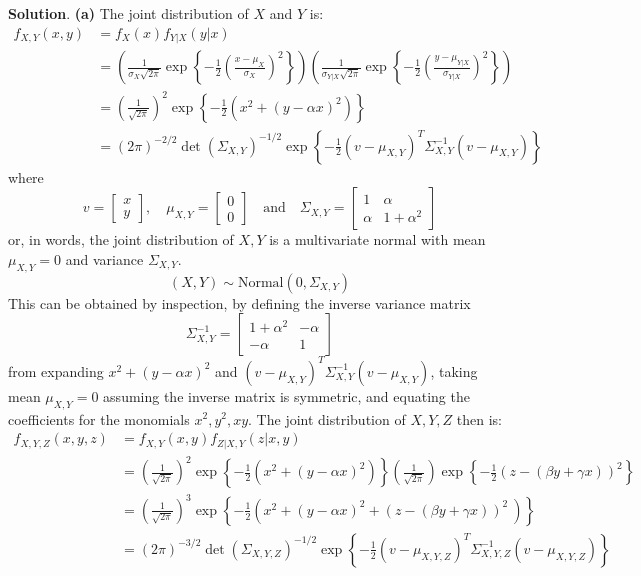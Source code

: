 \textbf{Solution}.
\textbf{(a)}
The joint distribution of \(X\) and \(Y\) is:
\begin{align*}
f_{X, Y}(x, y) &= f_X(x) f_{Y | X}(y | x) \\
&= \left(\frac{1}{\sigma_X \sqrt{2\pi}} \exp \left\{-\frac{1}{2} \left(\frac{x - \mu_X}{\sigma_X}\right)^{2} \right\} \right)
\left(\frac{1}{\sigma_{Y | X} \sqrt{2\pi}} \exp \left\{-\frac{1}{2} \left(\frac{y - \mu_{Y | X}}{\sigma_{Y | X}}\right)^{2} \right\}\right) \\
&= \left(\frac{1}{\sqrt{2\pi}}\right)^{2} \exp \left\{ -\frac{1}{2} \left( x^{2} + (y - \alpha x)^{2}\right) \right\} \\
&= (2 \pi)^{-2 / 2} \det (\Sigma_{X, Y})^{-1/2} \exp \left\{ -\frac{1}{2} (v - \mu_{X, Y})^T \Sigma_{X, Y}^{-1} (v - \mu_{X, Y})\right\}
\end{align*}
where
\[
v = \begin{bmatrix}x \\ y\end{bmatrix},
\quad \mu_{X, Y} = \begin{bmatrix}0 \\ 0\end{bmatrix}
\quad \text{and} \quad
\Sigma_{X, Y} = \begin{bmatrix}
1 & \alpha \\
\alpha & 1 + \alpha^{2}
\end{bmatrix}
\]
or, in words, the joint distribution of \(X, Y\) is a multivariate
normal with mean \(\mu_{X, Y} = 0\) and variance \(\Sigma_{X, Y}\).
\[
(X, Y) \sim \text{Normal}( 0, \Sigma_{X, Y})
\]
This can be obtained by inspection, by defining the inverse variance
matrix
\[
\Sigma_{X, Y}^{-1} = \begin{bmatrix}
1 + \alpha^{2} & -\alpha \\
-\alpha      & 1
\end{bmatrix}
\]
from expanding \(x^{2} + (y - \alpha x)^{2}\) and
\((v - \mu_{X, Y})^T \Sigma_{X, Y}^{-1} (v - \mu_{X, Y})\), taking mean
\(\mu_{X, Y} = 0\) assuming the inverse matrix is symmetric, and
equating the coefficients for the monomials \(x^{2}, y^{2}, xy\).
The joint distribution of \(X, Y, Z\) then is:
\begin{align*}
f_{X, Y, Z} (x, y, z) &= f_{X, Y}(x, y) f_{Z | X, Y}(z | x, y) \\
&= \left(\frac{1}{\sqrt{2\pi}}\right)^{2} \exp \left\{ -\frac{1}{2} \left( x^{2} + (y - \alpha x)^{2}\right) \right\} 
\left(\frac{1}{\sqrt{2\pi}} \right) \exp \left\{ -\frac{1}{2} (z - (\beta y + \gamma x))^{2}\right\} \\
&= \left(\frac{1}{\sqrt{2\pi}}\right)^{3} \exp \left\{ -\frac{1}{2} \left( x^{2} + (y - \alpha x)^{2} + (z - (\beta y + \gamma x))^{2}\ \right) \right\} \\
&= (2\pi)^{-3/2} \det(\Sigma_{X, Y, Z})^{-1/2} \exp \left\{ -\frac{1}{2} (v - \mu_{X, Y, Z})^T \Sigma_{X, Y, Z}^{-1} (v - \mu_{X, Y, Z})\right\}
\end{align*}
